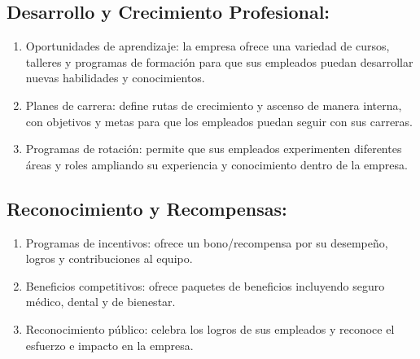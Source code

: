 \documentclass{article}
\begin{document}
 





\subsection{Desarrollo y Crecimiento Profesional:}

\begin{enumerate}
  \item Oportunidades de aprendizaje: la empresa ofrece una variedad de cursos, talleres y programas de formación para que sus empleados puedan desarrollar nuevas habilidades y conocimientos.
  \item Planes de carrera: define rutas de crecimiento y ascenso de manera interna, con objetivos y metas para que los empleados puedan seguir con sus carreras.
  \item Programas de rotación: permite que sus empleados experimenten diferentes áreas y roles ampliando su experiencia y conocimiento dentro de la empresa.
\end{enumerate}

\subsection{Reconocimiento y Recompensas:}

\begin{enumerate}
  \item Programas de incentivos: ofrece un bono/recompensa por su desempeño, logros y contribuciones al equipo.
  \item Beneficios competitivos: ofrece paquetes de beneficios incluyendo seguro médico, dental y de bienestar.
  \item Reconocimiento público: celebra los logros de sus empleados y reconoce el esfuerzo e impacto en la empresa.
\end{enumerate}
\end{document}
